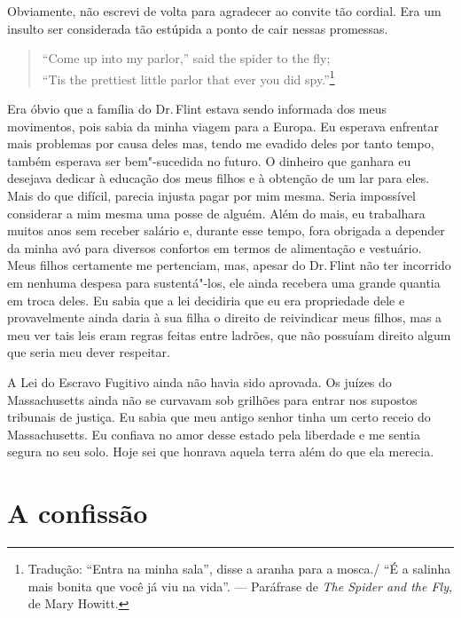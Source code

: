 Obviamente, não escrevi de volta para
agradecer ao convite tão cordial. Era um insulto ser considerada tão
estúpida a ponto de cair nessas promessas.

\begin{verse}
``Come up into my parlor,'' said the spider to \qb{}the fly;\\
``Tis the prettiest little parlor that ever you \qb{}did spy.''\footnote{Tradução: ``Entra
na minha sala'', disse a
aranha para a mosca./ ``É a salinha mais bonita que você já viu na
vida''. --- Paráfrase de \emph{The Spider and the Fly}, de Mary Howitt.}
\end{verse}

Era óbvio que a família do Dr.\,Flint
estava sendo informada dos meus movimentos, pois sabia da minha viagem
para a Europa. Eu esperava enfrentar mais problemas por causa deles mas,
tendo me evadido deles por tanto tempo, também esperava ser bem"-sucedida
no futuro. O dinheiro que ganhara eu desejava dedicar à educação dos
meus filhos e à obtenção de um lar para eles. Mais do que difícil,
parecia injusta pagar por mim mesma. Seria impossível considerar a mim
mesma uma posse de alguém. Além do mais, eu trabalhara muitos anos sem
receber salário e, durante esse tempo, fora obrigada a depender da minha
avó para diversos confortos em termos de alimentação e vestuário. Meus
filhos certamente me pertenciam, mas, apesar do Dr.\,Flint não ter
incorrido em nenhuma despesa para sustentá"-los, ele ainda recebera uma
grande quantia em troca deles. Eu sabia que a lei decidiria que eu era
propriedade dele e provavelmente ainda daria à sua filha o direito de
reivindicar meus filhos, mas a meu ver tais leis eram regras feitas
entre ladrões, que não possuíam direito algum que seria meu dever
respeitar.

A Lei do Escravo Fugitivo ainda não
havia sido aprovada. Os juízes do Massachusetts ainda não se curvavam
sob grilhões para entrar nos supostos tribunais de justiça. Eu sabia que
meu antigo senhor tinha um certo receio do Massachusetts. Eu confiava no
amor desse estado pela liberdade e me sentia segura no seu solo. Hoje
sei que honrava aquela terra além do que ela merecia.

\chapter*{A confissão}

